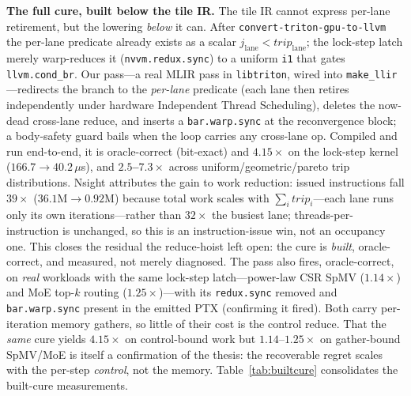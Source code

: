 \documentclass[conference]{IEEEtran}
\begin{document}
\textbf{The full cure, built below the tile IR.} The tile IR cannot express per-lane retirement, but the
lowering \emph{below} it can. After \texttt{convert-triton-gpu-to-llvm} the per-lane predicate already
exists as a scalar $j_{\mathrm{lane}}<\mathit{trip}_{\mathrm{lane}}$; the lock-step latch merely
warp-reduces it (\texttt{nvvm.redux.sync}) to a uniform \texttt{i1} that gates \texttt{llvm.cond\_br}. Our
pass---a real MLIR pass in \texttt{libtriton}, wired into \texttt{make\_llir}---redirects the branch to the
\emph{per-lane} predicate (each lane then retires independently under hardware Independent Thread
Scheduling), deletes the now-dead cross-lane reduce, and inserts a \texttt{bar.warp.sync} at the
reconvergence block; a body-safety guard bails when the loop carries any cross-lane op. Compiled and run
end-to-end, it is oracle-correct (bit-exact) and \textbf{$4.15\times$} on the lock-step kernel
($166.7\rightarrow40.2\,\mu$s), and \textbf{$2.5$--$7.3\times$} across uniform/geometric/pareto trip
distributions. Nsight attributes the gain to work reduction: issued instructions fall \textbf{$39\times$}
($36.1\mathrm{M}\rightarrow0.92\mathrm{M}$) because total work scales with $\sum_i \mathit{trip}_i$---each
lane runs only its own iterations---rather than $32\times$ the busiest lane; threads-per-instruction is
unchanged, so this is an instruction-issue win, not an occupancy one. This closes the residual the
reduce-hoist left open: the cure is \emph{built}, oracle-correct, and measured, not merely diagnosed. The pass also fires, oracle-correct, on \emph{real} workloads with the same lock-step
latch---power-law CSR SpMV ($1.14\times$) and MoE top-$k$ routing ($1.25\times$)---with its
\texttt{redux.sync} removed and \texttt{bar.warp.sync} present in the emitted PTX (confirming it fired).
Both carry per-iteration memory gathers, so little of their cost is the control reduce. That the \emph{same}
cure yields $4.15\times$ on control-bound work but $1.14$--$1.25\times$ on gather-bound SpMV/MoE is itself a
confirmation of the thesis: the recoverable regret scales with the per-step \emph{control}, not the memory.
Table~\ref{tab:builtcure} consolidates the built-cure measurements.
\end{document}
